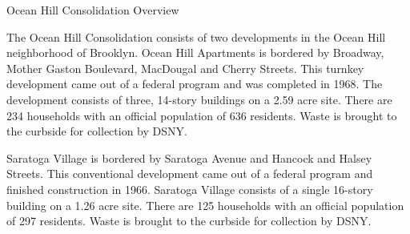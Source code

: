 Ocean Hill Consolidation Overview

The Ocean Hill Consolidation consists of two developments in the Ocean Hill neighborhood of Brooklyn. Ocean Hill Apartments is bordered by Broadway, Mother Gaston Boulevard, MacDougal and Cherry Streets. This turnkey development came out of a federal program and was completed in 1968. The development consists of three, 14-story buildings on a 2.59 acre site. There are 234 households with an official population of 636 residents. Waste is brought to the curbside for collection by DSNY.

Saratoga Village is bordered by Saratoga Avenue and Hancock and Halsey Streets. This conventional development came out of a federal program and finished construction in 1966. Saratoga Village consists of a single 16-story building on a 1.26 acre site. There are 125 households with an official population of 297 residents. Waste is brought to the curbside for collection by DSNY.
